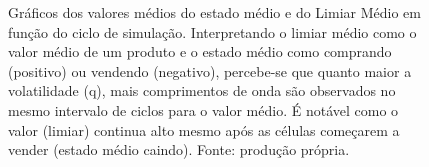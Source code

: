 \documentclass[
	12pt,				%
	openright,			%
	twoside,			%
	a4paper,			%
	english,			%
	french,				%
	spanish,			%
	brazil				%
	]{abntex2}
\begin{document}
\begin{figure}
  \centering

  
  \caption{Gráficos dos valores médios do estado médio e do Limiar Médio em função do ciclo de simulação. Interpretando o limiar médio como o valor médio de um produto e o estado médio como comprando (positivo) ou vendendo (negativo), percebe-se que quanto maior a volatilidade (q), mais comprimentos de onda são observados no mesmo intervalo de ciclos para o valor médio. É notável como o valor (limiar) continua alto mesmo após as células começarem a vender (estado médio caindo). Fonte: produção própria.}
  \label{fig:volatilidadeMoore}
\end{figure}
\end{document}
